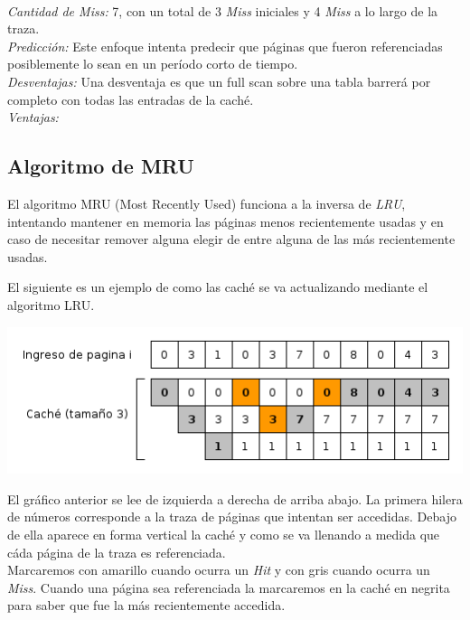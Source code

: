 \documentclass[11pt, a4paper, spanish]{article}
\begin{document}
 \\
\emph{Cantidad de Miss:} 7, con un total de 3 \emph{Miss} iniciales y 4 \emph{Miss} a lo largo de la traza.\\
\emph{Predicci\'on:} Este enfoque intenta predecir que p\'aginas que fueron referenciadas posiblemente lo sean en un per\'iodo corto de tiempo.\\
\emph{Desventajas:} Una desventaja es que un full scan sobre una tabla barrer\'a por completo con todas las entradas de la cach\'e.\\
\emph{Ventajas:} \\

\newpage
\subsection{Algoritmo de MRU}

El algoritmo MRU (Most Recently Used) funciona a la inversa de \textit{LRU}, intentando mantener en memoria las p\'aginas menos recientemente usadas
y en caso de necesitar remover alguna elegir de entre alguna de las m\'as recientemente usadas.

El siguiente es un ejemplo de como las cach\'e se va actualizando mediante el algoritmo LRU.

\begin{center}
		\includegraphics[scale=0.65]{diagramas/MRUAlgorithm.png}\\
\end{center}

El gr\'afico anterior se lee de izquierda a derecha de arriba abajo. La primera hilera de n\'umeros corresponde a la traza de p\'aginas que intentan ser 
accedidas. Debajo de ella aparece en forma vertical la cach\'e y como se va llenando a medida que c\'ada p\'agina de la traza es referenciada.\\ 

Marcaremos con amarillo cuando ocurra un \textit{Hit} y con gris cuando ocurra un \textit{Miss}.
Cuando una p\'agina sea referenciada la marcaremos en la cach\'e en negrita para saber que fue la m\'as recientemente accedida.\\
\end{document}
